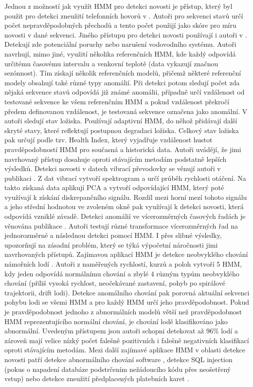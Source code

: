 Jednou z možností jak využít HMM pro detekci novosti je přístup, který byl použit pro detekci zneužití telefonních hovorů v \cite{hmm6}. Autoři pro sekvenci stavů určí počet nepravděpodobných přechodů a tento počet použijí jako skóre pro míru novosti v dané sekvenci. Jiného přístupu pro detekci novosti používají i autoři v \cite{hmm7}. Detekují zde potenciální poruchy nebo narušení vodovodního systému. Autoři navrhují, mimo jiné, využití několika referenčních HMM, kde každý odpovídá určitému časovému intervalu a venkovní teplotě (data vykazují značnou sezónnost). Tím získají několik referenčních modelů, přičemž některé referenční modely obsahují také různé typy anomálií. Při detekci potom sledují počet zda nějaká sekvence stavů odpovídá již známé anomálii, případně určí vzdálenost od testované sekvence ke všem referenčním HMM a pokud vzdálenost překročí předem definovanou vzdálenost, je testovaná sekvence označena jako anomální. V \cite{hmm8} autoři sledují stav ložiska. Používají adaptivní HMM, do něhož přidávají další skryté stavy, které reflektují postupnou degradaci ložiska. Celkový stav ložiska pak určují podle tzv. Health Index, který vyjadřuje vzdálenost hustot pravděpodobností HMM pro současná a historická data. Autoři uvádějí, že jimi navrhovaný přístup dosahuje oproti stávajícím metodám podstatně lepších výsledků. Detekci novosti v datech vibrací převodovky se věnují autoři v publikaci \cite{hmm9}. Z dat vibrací vytvoří spektrogram a určí průběh rychlosti otáčení. Na takto získaná data aplikují PCA \cite{pca} a vytvoří odpovídající HMM, který poté využívají k získání diskrepančního signálu. Rozdíl mezi horní mezí tohoto signálu a jeho střední hodnotou ve zvoleném okně pak využívají k detekci novosti, která odpovídá vzniklé závadě. Detekci anomálií ve vícerozměrných časových řadách je věnována publikace \cite{hmm10}. Autoři testují různé transformace vícerozměrných řad na jednorozměrné a následnou detekci pomocí HMM. I přes slibné výsledky, upozorňují na zásadní problém, který se týká výpočetní náročnosti jimi navrhovaných přístupů. Zajímavou aplikací HMM je detekce neobvyklého chování námořních lodí \cite{hmm11}. Autoři z naměřených rychlostí, kurzů a poloh vytvoří 5 HMM, kdy jeden odpovídá normálnímu chování a zbylé 4 různým typům neobvyklého chování (příliš vysoká rychlost, neočekávané zastavení, pohyb po spirálové trajektorii, drift lodi). Detekce anomálního chování pak porovná aktuální sekvenci pohybu lodi se všemi HMM a pro každý HMM určí jeho pravděpodobnost. Pokud je pravděpodobnost jednoho z abnormálních modelů větší než pravděpodobnost HMM reprezentujícího normální chování, je chování lodě klasifikováno jako abnormální. Uvedeným přístupem jsou autoři schopni detekovat až $96\%$ lodí a zároveň mají velice nízký počet falešně pozitivních i falešně negativních klasifikací oproti stávajícím metodám. Mezi další zajímavé aplikace HMM v oblasti detekce novosti patří detekce abnormálního chování software \cite{hmm12}, detekce SQL injection \cite{hmm13} (pokus o napadení databáze podstrčením nežádoucího kódu přes neošetřený vstup) nebo detekce zneužití předplacených platebních karet \cite{hmm14}.


